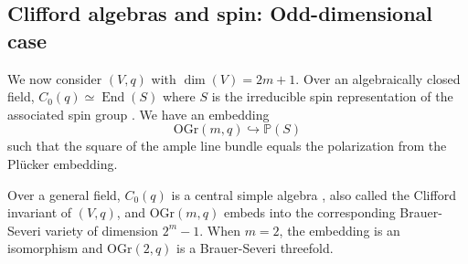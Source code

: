 \documentclass[12pt]{amsart}
\numberwithin{equation}{section}
\newcommand{\bP}{\mathbb{P}}
\newcommand{\End}{\operatorname{End}}
\newcommand{\OGr}{\mathrm{OGr}}
\theoremstyle{plain}
\theoremstyle{definition}
\theoremstyle{remark}
\begin{document}
\subsection*{Clifford algebras and spin: Odd-dimensional case}
We now consider $(V,q)$ with $\dim(V)=2m+1$. 
Over an algebraically closed field, $C_0(q) \simeq \End(S)$
where $S$ is the irreducible spin representation of the associated
spin group \cite[Prop.~20.20]{FulHar}.
We have an embedding \cite[p.~390]{FulHar}
$$\OGr(m,q) \hookrightarrow \bP(S)$$
such that the square of the ample line bundle equals
the polarization from the Pl\"ucker embedding.  

Over a general field, $C_0(q)$ is a central simple algebra
\cite[Prop.~11.6(2)]{EKMbook}, also called 
the Clifford invariant of $(V,q)$,
and $\OGr(m,q)$ embeds into the corresponding Brauer-Severi
variety of dimension $2^m-1$.  
When $m=2$, the embedding is an isomorphism and 
$\OGr(2,q)$ is a Brauer-Severi threefold.
\end{document}
